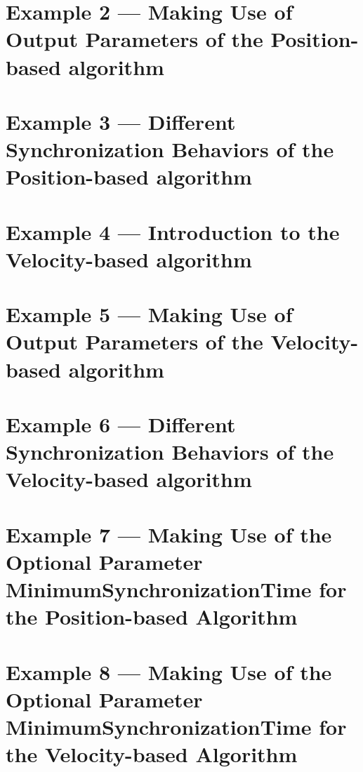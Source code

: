 \let\mypdfximage\pdfximage\def\pdfximage{\immediate\mypdfximage}\documentclass[twoside]{book}
\newcommand{\+}{\discretionary{\mbox{\scriptsize$\hookleftarrow$}}{}{}}
\begin{document}
\chapter{Example 2 --- Making Use of Output Parameters of the Position-\/based algorithm}
\label{page_Code_02_RMLPositionSampleApplication}

\chapter{Example 3 --- Different Synchronization Behaviors of the Position-\/based algorithm}
\label{page_Code_03_RMLPositionSampleApplication}

\chapter{Example 4 --- Introduction to the Velocity-\/based algorithm}
\label{page_Code_04_RMLVelocitySampleApplication}

\chapter{Example 5 --- Making Use of Output Parameters of the Velocity-\/based algorithm}
\label{page_Code_05_RMLVelocitySampleApplication}

\chapter{Example 6 --- Different Synchronization Behaviors of the Velocity-\/based algorithm}
\label{page_Code_06_RMLVelocitySampleApplication}

\chapter{Example 7 --- Making Use of the Optional Parameter Minimum\+Synchronization\+Time for the Position-\/based Algorithm}
\label{page_Code_07_RMLPositionSampleApplication}

\chapter{Example 8 --- Making Use of the Optional Parameter Minimum\+Synchronization\+Time for the Velocity-\/based Algorithm}
\label{page_Code_08_RMLVelocitySampleApplication}

\end{document}
